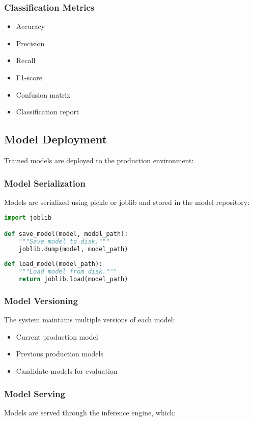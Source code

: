 \subsubsection{Classification Metrics}
\begin{itemize}
    \item Accuracy
    \item Precision
    \item Recall
    \item F1-score
    \item Confusion matrix
    \item Classification report
\end{itemize}

\subsection{Model Deployment}
Trained models are deployed to the production environment:

\subsubsection{Model Serialization}
Models are serialized using pickle or joblib and stored in the model repository:

\begin{lstlisting}[language=Python, caption=Model Serialization]
import joblib

def save_model(model, model_path):
    """Save model to disk."""
    joblib.dump(model, model_path)
    
def load_model(model_path):
    """Load model from disk."""
    return joblib.load(model_path)
\end{lstlisting}

\subsubsection{Model Versioning}
The system maintains multiple versions of each model:

\begin{itemize}
    \item Current production model
    \item Previous production models
    \item Candidate models for evaluation
\end{itemize}

\subsubsection{Model Serving}
Models are served through the inference engine, which:

